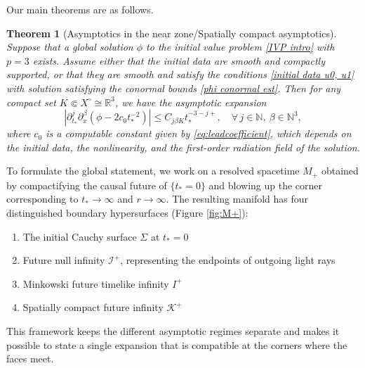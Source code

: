 \documentclass[10pt,a4paper,reqno]{amsart}
\newcommand{\pa}{\partial}
\newtheorem{theorem}{Theorem}[section]
\theoremstyle{definition}
\theoremstyle{remark}
\numberwithin{equation}{section}
\newcommand{\R}{\mathbb R}
\newcommand{\ts}{t_*}
\begin{document}
Our main theorems are as follows.

\begin{theorem}[Asymptotics in the near zone/Spatially compact asymptotics]\label{thm:compactmain intro}
Suppose that a global solution $\phi$ to the initial value problem \eqref{IVP intro} with $p=3$ exists. Assume either that the initial data are smooth and compactly supported, or that they are smooth and satisfy the conditions \eqref{initial data u0, u1} with solution satisfying the conormal bounds \eqref{phi conormal est}. Then for any compact set $K \Subset X^\circ \cong \R^3$, we have the asymptotic expansion
\begin{equation}
\label{phi asymp spatial compact intro}
|\pa_{\ts}^j \pa_x^\beta (\phi - 2c_0 t_*^{-2})|\leq C_{j\beta K} t_*^{-3-j+},\quad \forall\, j\in\mathbb{N},\ \beta\in\mathbb{N}^3,
\end{equation}
where $c_0$ is a computable constant given by \eqref{eq:leadcoefficient}, which depends on the initial data, the nonlinearity, and the first-order radiation field of the solution.
\end{theorem}

To formulate the global statement, we work on a resolved spacetime $M_+$ obtained by compactifying the causal future of $\{t_*=0\}$ and blowing up the corner corresponding to $t_*\to\infty$ and $r\to\infty$. The resulting manifold has four distinguished boundary hypersurfaces (Figure \ref{fig:M+}):
\begin{enumerate}
    \item The initial Cauchy surface $\Sigma$ at $t_* = 0$
    \item Future null infinity $\mathscr{I}^+$, representing the endpoints of outgoing light rays
    \item Minkowski future timelike infinity $I^+$
    \item Spatially compact future infinity $\mathcal K^+$
\end{enumerate}

This framework keeps the different asymptotic regimes separate and makes it possible to state a single expansion that is compatible at the corners where the faces meet. 
\end{document}
